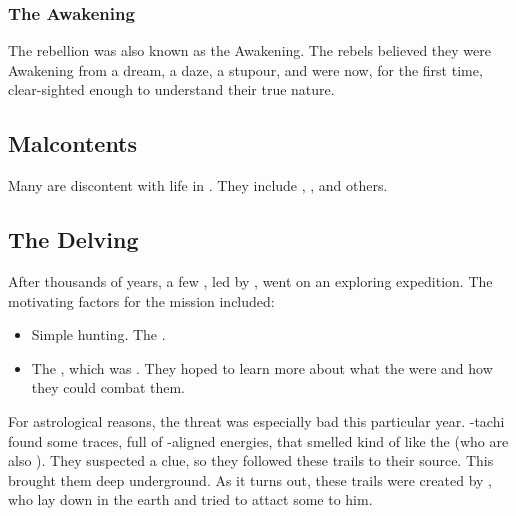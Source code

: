 \subsubsection{The Awakening}
The \resphan{} rebellion was also known as the Awakening.
The rebels believed they were Awakening from a dream, a daze, a stupour, and were now, for the first time, clear-sighted enough to understand their true nature. 










\subsection{Malcontents}
Many are discontent with life in \Merkyrah. 
They include \Kezrabal, \Gevural, \Zachirah{} and others. 











\subsection{The Delving}
\index{\Delving}
After thousands of years, a few \resphain, led by \Damiarch, went on an exploring expedition. 
The motivating factors for the mission included: 

\begin{itemize}
  \item 
    Simple hunting. 
    The \resphain{} . 
  \item 
    The , which was . 
    They hoped to learn more about what the \umbrae{} were and how they could combat them. 
\end{itemize}

For astrological reasons, the \umbra{} threat was especially bad this particular year. 
\Damiarch-tachi found some traces, full of \Erebos-aligned energies, that smelled kind of like the \umbrae{} (who are also \Erebean). 
They suspected a clue, so they followed these trails to their source.
This brought them deep underground. 
As it turns out, these trails were created by \Semiza, who lay down in the earth and tried to attact some \resphain{} to him. 

